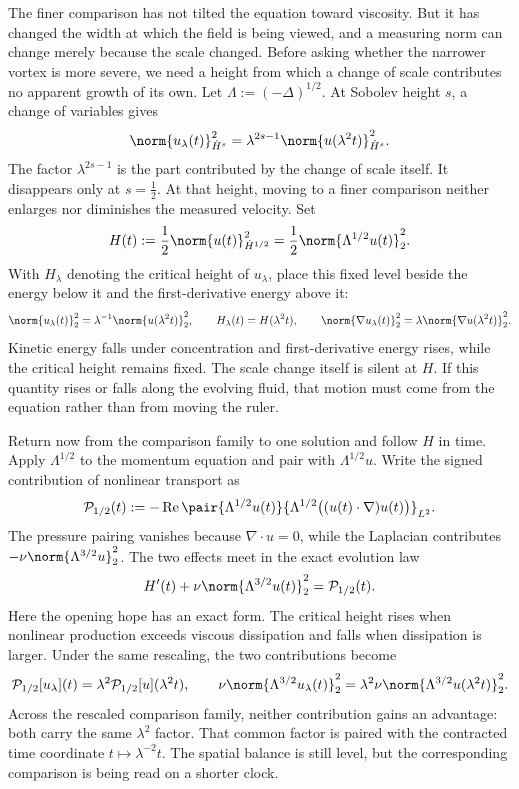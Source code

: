 
The finer comparison has not tilted the equation toward viscosity.
But it has changed the width at which the field is being viewed, and a measuring norm can change merely because the scale changed.
Before asking whether the narrower vortex is more severe, we need a height from which a change of scale contributes no apparent growth of its own.
Let \(\Lambda:=(-\Delta)^{1/2}\).
At Sobolev height \(s\), a change of variables gives
\[
  \norm{u_\lambda(t)}_{\dot H^s}^2
  =
  \lambda^{2s-1}
  \norm{u(\lambda^2t)}_{\dot H^s}^2.
\]
The factor \(\lambda^{2s-1}\) is the part contributed by the change of scale itself.
It disappears only at \(s=\tfrac12\).
At that height, moving to a finer comparison neither enlarges nor diminishes the measured velocity.
Set
\[
  H(t)
  :=
  \frac12\norm{u(t)}_{\dot H^{1/2}}^2
  =
  \frac12\norm{\Lambda^{1/2}u(t)}_2^2.
\]
With \(H_\lambda\) denoting the critical height of \(u_\lambda\), place this fixed level beside the energy below it and the first-derivative energy above it:
\[
  \norm{u_\lambda(t)}_2^2
  =
  \lambda^{-1}\norm{u(\lambda^2t)}_2^2,
  \qquad
  H_\lambda(t)=H(\lambda^2t),
  \qquad
  \norm{\nabla u_\lambda(t)}_2^2
  =
  \lambda\norm{\nabla u(\lambda^2t)}_2^2.
\]
Kinetic energy falls under concentration and first-derivative energy rises, while the critical height remains fixed.
The scale change itself is silent at \(H\).
If this quantity rises or falls along the evolving fluid, that motion must come from the equation rather than from moving the ruler.


Return now from the comparison family to one solution and follow \(H\) in time.
Apply \(\Lambda^{1/2}\) to the momentum equation and pair with \(\Lambda^{1/2}u\).
Write the signed contribution of nonlinear transport as
\[
  \mathcal P_{1/2}(t)
  :=
  -\operatorname{Re}
  \pair
    {\Lambda^{1/2}u(t)}
    {\Lambda^{1/2}\bigl((u(t)\cdot\nabla)u(t)\bigr)}_{L^2}.
\]
The pressure pairing vanishes because \(\nabla\cdot u=0\), while the Laplacian contributes \(-\nu\norm{\Lambda^{3/2}u}_2^2\).
The two effects meet in the exact evolution law
\[
  H'(t)
  +
  \nu\norm{\Lambda^{3/2}u(t)}_2^2
  =
  \mathcal P_{1/2}(t).
\]
Here the opening hope has an exact form.
The critical height rises when nonlinear production exceeds viscous dissipation and falls when dissipation is larger.
Under the same rescaling, the two contributions become
\[
  \mathcal P_{1/2}[u_\lambda](t)
  =
  \lambda^2\mathcal P_{1/2}[u](\lambda^2t),
  \qquad
  \nu\norm{\Lambda^{3/2}u_\lambda(t)}_2^2
  =
  \lambda^2\nu\norm{\Lambda^{3/2}u(\lambda^2t)}_2^2.
\]
Across the rescaled comparison family, neither contribution gains an advantage: both carry the same \(\lambda^2\) factor.
That common factor is paired with the contracted time coordinate \(t\mapsto\lambda^{-2}t\).
The spatial balance is still level, but the corresponding comparison is being read on a shorter clock.


